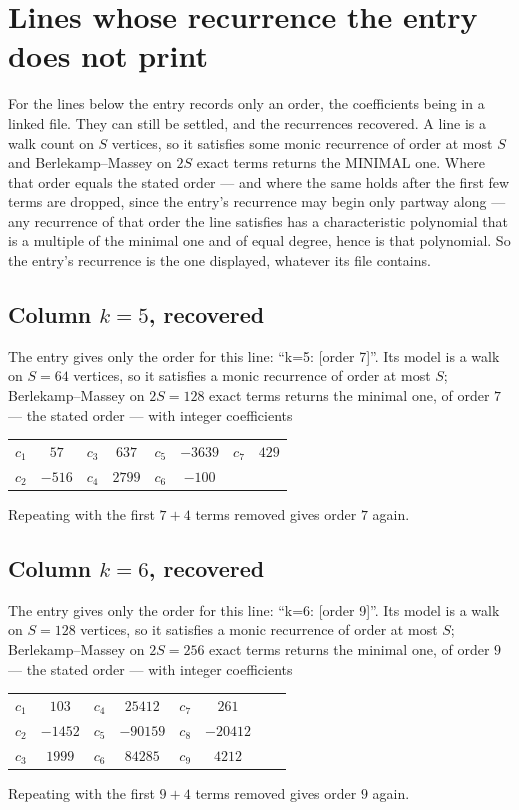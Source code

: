 \documentclass[11pt,a4paper]{article}
\theoremstyle{plain}
\theoremstyle{definition}
\begin{document}
\section{Lines whose recurrence the entry does not print}

For the lines below the entry records only an order, the coefficients being in a linked file.
They can still be settled, and the recurrences recovered. A line is a walk count on $S$
vertices, so it satisfies some monic recurrence of order at most $S$ and Berlekamp--Massey on
$2S$ exact terms returns the MINIMAL one. Where that order equals the stated order --- and
where the same holds after the first few terms are dropped, since the entry's recurrence may
begin only partway along --- any recurrence of that order the line satisfies has a
characteristic polynomial that is a multiple of the minimal one and of equal degree, hence is
that polynomial. So the entry's recurrence is the one displayed, whatever its file contains.

\subsection*{Column $k=5$, recovered}
The entry gives only the order for this line: ``k=5: [order 7]''. Its model is a walk on
$S=64$ vertices, so it satisfies a monic recurrence of order at most $S$;
Berlekamp--Massey on $2S=128$ exact terms returns the minimal one, of order
$7$ --- the stated order --- with integer coefficients
\begin{center}\small\begin{tabular}{cccccccc}
$c_{1}$ & $57$ & $c_{3}$ & $637$ & $c_{5}$ & $-3639$ & $c_{7}$ & $429$ \\
$c_{2}$ & $-516$ & $c_{4}$ & $2799$ & $c_{6}$ & $-100$ &  &  \\
\end{tabular}\end{center}
Repeating with the first $7+4$ terms removed gives order $7$ again.

\subsection*{Column $k=6$, recovered}
The entry gives only the order for this line: ``k=6: [order 9]''. Its model is a walk on
$S=128$ vertices, so it satisfies a monic recurrence of order at most $S$;
Berlekamp--Massey on $2S=256$ exact terms returns the minimal one, of order
$9$ --- the stated order --- with integer coefficients
\begin{center}\small\begin{tabular}{cccccccc}
$c_{1}$ & $103$ & $c_{4}$ & $25412$ & $c_{7}$ & $261$ &  &  \\
$c_{2}$ & $-1452$ & $c_{5}$ & $-90159$ & $c_{8}$ & $-20412$ &  &  \\
$c_{3}$ & $1999$ & $c_{6}$ & $84285$ & $c_{9}$ & $4212$ &  &  \\
\end{tabular}\end{center}
Repeating with the first $9+4$ terms removed gives order $9$ again.
\end{document}
